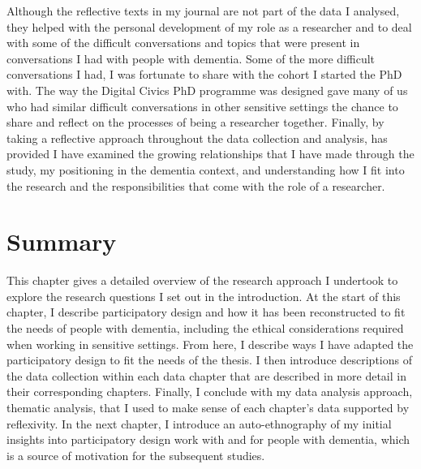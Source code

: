 Although the reflective texts in my journal are not part of the data I analysed, they helped with the personal development of my role as a researcher and to deal with some of the difficult conversations and topics that were present in conversations I had with people with dementia. Some of the more difficult conversations I had, I was fortunate to share with the cohort I started the PhD with. The way the Digital Civics PhD programme was designed gave many of us who had similar difficult conversations in other sensitive settings the chance to share and reflect on the processes of being a researcher together. Finally, by taking a reflective approach throughout the data collection and analysis, has provided I have examined the growing relationships that I have made through the study, my positioning in the dementia context, and understanding how I fit into the research and the responsibilities that come with the role of a researcher. 

\section{Summary}
\label{Method:summary}
This chapter gives a detailed overview of the research approach I undertook to explore the research questions I set out in the introduction. At the start of this chapter, I describe participatory design and how it has been reconstructed to fit the needs of people with dementia, including the ethical considerations required when working in sensitive settings. From here, I describe ways I have adapted the participatory design to fit the needs of the thesis. I then introduce descriptions of the data collection within each data chapter that are described in more detail in their corresponding chapters. Finally, I conclude with my data analysis approach, thematic analysis, that I used to make sense of each chapter's data supported by reflexivity. In the next chapter, I introduce an auto-ethnography of my initial insights into participatory design work with and for people with dementia, which is a source of motivation for the subsequent studies.
